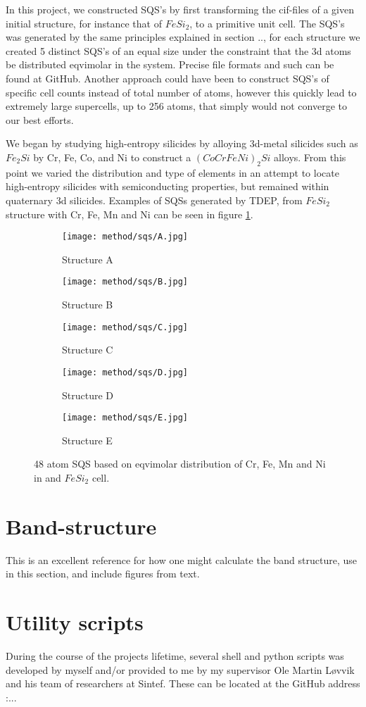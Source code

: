 In this project, we constructed SQS's by first transforming the cif-files of a given initial structure, for instance that of $FeSi_2$, to a primitive unit cell. The SQS's was generated by the same principles explained in section .., for each structure we created 5 distinct SQS's of an equal size under the constraint that the 3d atoms be distributed eqvimolar in the system. Precise file formats and such can be found at GitHub. Another approach could have been to construct SQS's of specific cell counts instead of total number of atoms, however this quickly lead to extremely large supercells, up to 256 atoms, that simply would not converge to our best efforts. 

We began by studying high-entropy silicides by alloying 3d-metal silicides such as $Fe_2Si$ by Cr, Fe, Co, and Ni to construct a $(CoCrFeNi)_2Si$ alloys. From this point we varied the distribution and type of elements in an attempt to locate high-entropy silicides with semiconducting properties, but remained within quaternary 3d silicides. Examples of SQSs generated by TDEP, from $FeSi_2$ structure with Cr, Fe, Mn and Ni can be seen in figure \ref{sqs_FeSi2}.

\begin{figure}
\begin{subfigure}{0.5\textwidth}
\texttt{[image: method/sqs/A.jpg]}
\caption{Structure A}
\end{subfigure}
\hfill
\begin{subfigure}{0.5\textwidth}
\texttt{[image: method/sqs/B.jpg]}
\caption{Structure B}
\end{subfigure}
\begin{subfigure}{0.5\textwidth}
\texttt{[image: method/sqs/C.jpg]}
\caption{Structure C}
\end{subfigure}
\hfill
\begin{subfigure}{0.5\textwidth}
\texttt{[image: method/sqs/D.jpg]}
\caption{Structure D}
\end{subfigure}
\begin{subfigure}{0.5\textwidth}
\texttt{[image: method/sqs/E.jpg]}
\caption{Structure E}
\end{subfigure}
\caption{48 atom SQS based on eqvimolar distribution of Cr, Fe, Mn and Ni in and $FeSi_2$ cell.}
\label{sqs_FeSi2}
\end{figure}

\section{Band-structure}
This \cite{bandstructure} is an excellent reference for how one might calculate the band structure, use in this section, and include figures from text.

\section{Utility scripts}
During the course of the projects lifetime, several shell and python scripts was developed by myself and/or provided to me by my supervisor Ole Martin Løvvik and his team of researchers at Sintef. These can be located at the GitHub address :...
